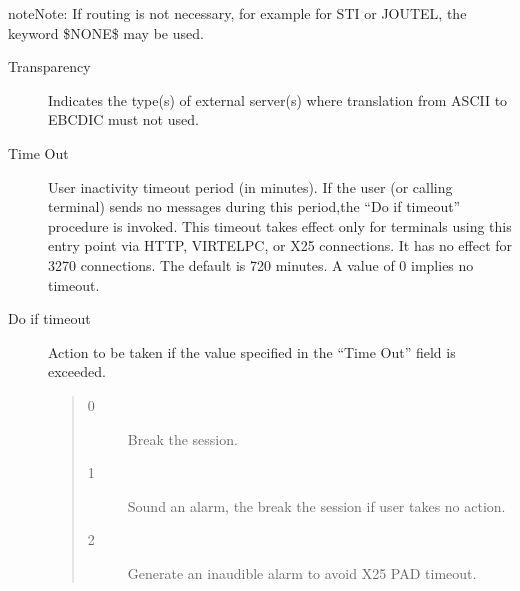 \documentclass[letterpaper,10pt,english]{sphinxmanual}
\begin{document}
\begin{sphinxadmonition}{note}{Note:}
If routing is not necessary, for example for STI or JOUTEL, the keyword \$NONE\$ may be used.
\end{sphinxadmonition}
\begin{description}
\item[{Transparency}] \leavevmode
Indicates the type(s) of external server(s) where translation from ASCII to EBCDIC must not used.

\item[{Time Out}] \leavevmode
User inactivity timeout period (in minutes). If the user (or calling terminal) sends no messages during this period,the “Do if timeout” procedure is invoked. This timeout takes effect only for terminals using this entry point via HTTP, VIRTELPC, or X25 connections. It has no effect for 3270 connections. The default is 720 minutes. A value of 0 implies no timeout.

\item[{Do if timeout}] \leavevmode
Action to be taken if the value specified in the “Time Out” field is exceeded.
\begin{quote}
\begin{description}
\item[{0}] \leavevmode
Break the session.

\item[{1}] \leavevmode
Sound an alarm, the break the session if user takes no action.

\item[{2}] \leavevmode
Generate an inaudible alarm to avoid X25 PAD timeout.

\end{description}
\end{quote}

\end{description}
\end{document}
